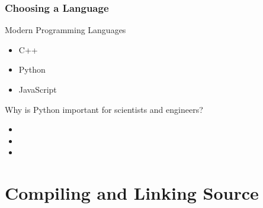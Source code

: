 \documentclass[fleqn]{beamer} %
\newcommand{\sectiontitleII}{Choosing a Language}
\newcommand{\sectiontitleIII}{Compiling and Linking Source}
\begin{document}
	\begin{frame} \small
		\frametitle{\sectiontitleII}
		
		Modern Programming Languages 
		\begin{itemize}
			\item C++
			\item Python
			\item JavaScript
		\end{itemize}
		
		Why is Python important for scientists and engineers? 
		\begin{itemize}
			\item 
			\item
			\item
		\end{itemize}
	
	\end{frame}	

\section{\sectiontitleIII}

		
		
		
		
		
		


\end{document}
